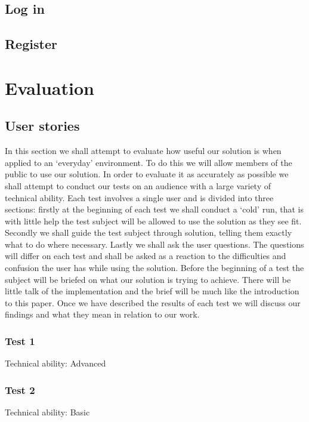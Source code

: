 \documentclass[12pt, titlepage]{article}
\begin{document}
\subsection{Log in}


\subsection{Register}


\section{Evaluation}

\subsection{User stories}
In this section we shall attempt to evaluate how useful our solution is when applied to an `everyday' environment. To do this we will allow members of the public to use our solution. In order to evaluate it as accurately as possible we shall attempt to conduct our tests on an audience with a large variety of technical ability.
\newline \indent Each test involves a single user and is divided into three sections: firstly at the beginning of each test we shall conduct a `cold' run, that is with little help the test subject will be allowed to use the solution as they see fit. Secondly we shall guide the test subject through solution, telling them exactly what to do where necessary. Lastly we shall ask the user questions. The questions will differ on each test and shall be asked as a reaction to the difficulties and confusion the user has while using the solution.
\newline \indent Before the beginning of a test the subject will be briefed on what our solution is trying to achieve. There will be little talk of the implementation and the brief will be much like the introduction to this paper.
\newline \indent Once we have described the results of each test we will discuss our findings and what they mean in relation to our work.

\subsubsection{Test 1}
Technical ability: Advanced

\subsubsection{Test 2}
Technical ability: Basic
\end{document}

